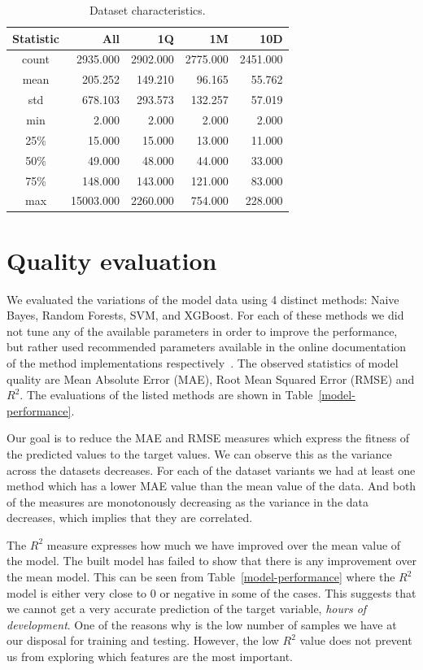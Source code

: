 \documentclass[conference,compsoc]{IEEEtran}
\begin{document}
\begin{table}[!t]
	\caption{Dataset characteristics. }
	\label{dataset-description}
	\centering
	\begin{tabular}{c|r|r|r|r}
		Statistic &        All  & 1Q & 1M & 10D \\
		\hline
		count &  2935.000  &     2902.000  &   2775.000 &   2451.000 \\
		mean  &   205.252  &      149.210  &     96.165 &     55.762 \\
		std   &   678.103  &      293.573  &    132.257 &     57.019 \\
		min   &     2.000  &        2.000  &      2.000 &      2.000 \\
		25\%   &    15.000  &       15.000  &     13.000 &     11.000 \\
		50\%   &    49.000  &       48.000  &     44.000 &     33.000 \\
		75\%   &   148.000  &      143.000  &    121.000 &     83.000 \\
		max   & 15003.000  &     2260.000  &    754.000 &    228.000 \\
	\end{tabular}
\end{table}


\section{Quality evaluation}
We evaluated the variations of the model data using 4 distinct methods: Naive Bayes, Random Forests, SVM, and XGBoost. For each of these methods we did not tune any of the available parameters in order to improve the performance, but rather used recommended parameters available in the online documentation of the method implementations respectively~\cite{chen2016xgboost, scikit-learn}. The observed statistics of model quality are Mean Absolute Error (MAE), Root Mean Squared Error (RMSE) and $R^2$. The evaluations of the listed methods are shown in Table~\ref{model-performance}.

Our goal is to reduce the MAE and RMSE measures which express the fitness of the predicted values to the target values. We can observe this as the variance across the datasets decreases. For each of the dataset variants we had at least one method which has a lower MAE value than the mean value of the data. And both of the measures are monotonously decreasing as the variance in the data decreases, which implies that they are correlated.

The $R^2$ measure expresses how much we have improved over the mean value of the model. The built model has failed to show that there is any improvement over the mean model. This can be seen from Table~\ref{model-performance} where the $R^2$ model is either very close to $0$ or negative in some of the cases. This suggests that we cannot get a very accurate prediction of the target variable, \textit{hours of development}. One of the reasons why is the low number of samples we have at our disposal for training and testing. However, the low $R^2$ value does not prevent us from exploring which features are the most important.
\end{document}

